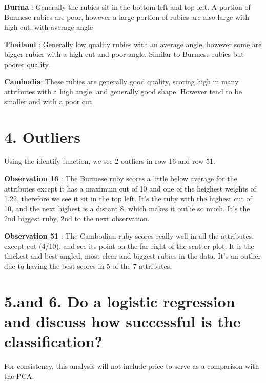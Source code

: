 \documentclass[
  8pt,
]{article}
\begin{document}
\textbf{Burma} : Generally the rubies sit in the bottom left and top
left. A portion of Burmese rubies are poor, however a large portion of
rubies are also large with high cut, with average angle

\textbf{Thailand} : Generally low quality rubies with an average angle,
however some are bigger rubies with a high cut and poor angle. Similar
to Burmese rubies but poorer quality.

\textbf{Cambodia}: These rubies are generally good quality, scoring high
in many attributes with a high angle, and generally good shape. However
tend to be smaller and with a poor cut.

\hypertarget{outliers}{%
\section{4. Outliers}\label{outliers}}

Using the identify function, we see 2 outliers in row 16 and row 51.

\textbf{Observation 16} : The Burmese ruby scores a little below average
for the attributes except it has a maximum cut of 10 and one of the
heighest weights of 1.22, therefore we see it sit in the top left. It's
the ruby with the highest cut of 10, and the next highest is a distant
8, which makes it outlie so much. It's the 2nd biggest ruby, 2nd to the
next observation.

\textbf{Observation 51} : The Cambodian ruby scores really well in all
the attributes, except cut (4/10), and see its point on the far right of
the scatter plot. It is the thickest and best angled, most clear and
biggest rubies in the data. It's an outlier due to having the best
scores in 5 of the 7 attributes.

\hypertarget{and-6.-do-a-logistic-regression-and-discuss-how-successful-is-the-classification}{%
\section{5.and 6. Do a logistic regression and discuss how successful is
the
classification?}\label{and-6.-do-a-logistic-regression-and-discuss-how-successful-is-the-classification}}

For consistency, this analysis will not include price to serve as a
comparison with the PCA.
\end{document}
